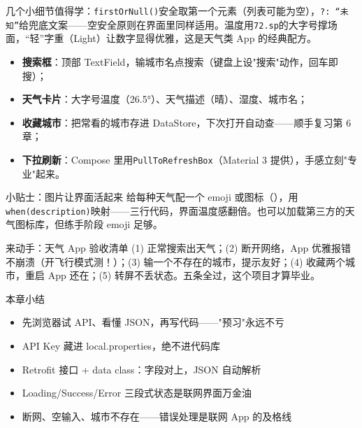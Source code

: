 几个小细节值得学：\texttt{firstOrNull()}安全取第一个元素（列表可能为空），\texttt{?: “未知”}给兜底文案——空安全原则在界面里同样适用。温度用\texttt{72.\allowbreak sp}的大字号撑场面，“轻”字重（Light）让数字显得优雅，这是天气类 App 的经典配方。


\begin{itemize}
  \item \textbf{搜索框}：顶部 TextField，输城市名点搜索（键盘上设"搜索"动作，回车即搜）；
  \item \textbf{天气卡片}：大字号温度（26.5°）、天气描述（晴）、湿度、城市名；
  \item \textbf{收藏城市}：把常看的城市存进 DataStore，下次打开自动查——顺手复习第 6 章；
  \item \textbf{下拉刷新}：Compose 里用\texttt{PullToRefreshBox}（Material 3 提供），手感立刻"专业"起来。
\end{itemize}

\begin{tcbinfo}{小贴士：图片让界面活起来}
给每种天气配一个 emoji 或图标（），用\texttt{when(description)}映射——三行代码，界面温度感翻倍。也可以加载第三方的天气图标库，但练手阶段 emoji 足够。

\end{tcbinfo}

\begin{tcbpractice}{来动手：天气 App 验收清单}
(1) 正常搜索出天气；(2) 断开网络，App 优雅报错不崩溃（开飞行模式测！）；(3) 输一个不存在的城市，提示友好；(4) 收藏两个城市，重启 App 还在；(5) 转屏不丢状态。五条全过，这个项目才算毕业。

\end{tcbpractice}

\begin{tcbsummary}{本章小结}
\begin{itemize}
  \item 先浏览器试 API、看懂 JSON，再写代码——"预习"永远不亏
  \item API Key 藏进 local.properties，绝不进代码库
  \item Retrofit 接口 + data class：字段对上，JSON 自动解析
  \item Loading/Success/Error 三段式状态是联网界面万金油
  \item 断网、空输入、城市不存在——错误处理是联网 App 的及格线
\end{itemize}

\end{tcbsummary}
